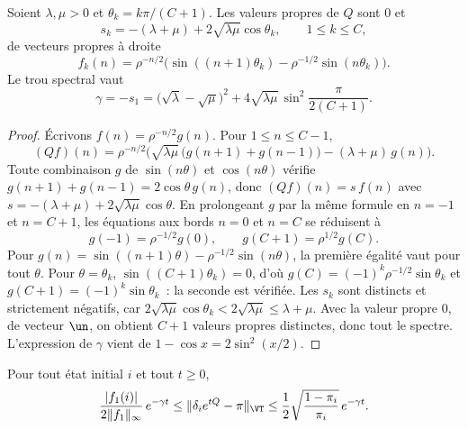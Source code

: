 \begin{theoreme}[spectre]\label{thm:spectre}
Soient $\lambda,\mu>0$ et $\theta_k=k\pi/(C+1)$. Les valeurs propres de $Q$ sont $0$ et
\[
s_k=-(\lambda+\mu)+2\sqrt{\lambda\mu}\cos\theta_k,\qquad1\leq k\leq C,
\]
de vecteurs propres à droite
\[
f_k(n)=\rho^{-n/2}\big(\sin((n+1)\theta_k)-\rho^{-1/2}\sin(n\theta_k)\big).
\]
Le trou spectral vaut
\[
\gamma=-s_1=\big(\sqrt\lambda-\sqrt\mu\big)^2+4\sqrt{\lambda\mu}\,\sin^2\frac{\pi}{2(C+1)}.
\]
\end{theoreme}

\begin{proof}
Écrivons $f(n)=\rho^{-n/2}g(n)$. Pour $1\leq n\leq C-1$,
\[
(Qf)(n)=\rho^{-n/2}\Big(\sqrt{\lambda\mu}\,\big(g(n+1)+g(n-1)\big)-(\lambda+\mu)\,g(n)\Big).
\]
Toute combinaison $g$ de $\sin(n\theta)$ et $\cos(n\theta)$ vérifie $g(n+1)+g(n-1)=2\cos\theta\,g(n)$, donc $(Qf)(n)=s\,f(n)$ avec $s=-(\lambda+\mu)+2\sqrt{\lambda\mu}\cos\theta$. En prolongeant $g$ par la même formule en $n=-1$ et $n=C+1$, les équations aux bords $n=0$ et $n=C$ se réduisent à
\[
g(-1)=\rho^{-1/2}g(0),\qquad g(C+1)=\rho^{1/2}g(C).
\]
Pour $g(n)=\sin((n+1)\theta)-\rho^{-1/2}\sin(n\theta)$, la première égalité vaut pour tout $\theta$. Pour $\theta=\theta_k$, $\sin((C+1)\theta_k)=0$, d'où $g(C)=(-1)^k\rho^{-1/2}\sin\theta_k$ et $g(C+1)=(-1)^k\sin\theta_k$~: la seconde est vérifiée. Les $s_k$ sont distincts et strictement négatifs, car $2\sqrt{\lambda\mu}\cos\theta_k<2\sqrt{\lambda\mu}\leq\lambda+\mu$. Avec la valeur propre $0$, de vecteur $\un$, on obtient $C+1$ valeurs propres distinctes, donc tout le spectre. L'expression de $\gamma$ vient de $1-\cos x=2\sin^2(x/2)$.
\end{proof}

\begin{theoreme}\label{thm:vitesse}
Pour tout état initial $i$ et tout $t\geq0$,
\[
\frac{|f_1(i)|}{2\|f_1\|_\infty}\,e^{-\gamma t}\leq\|\delta_ie^{tQ}-\pi\|_\VT\leq\frac12\sqrt{\frac{1-\pi_i}{\pi_i}}\,e^{-\gamma t}.
\]
\end{theoreme}

